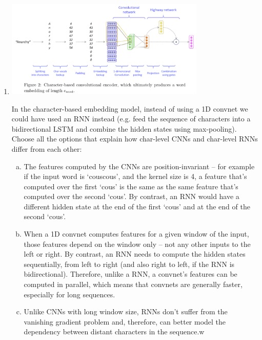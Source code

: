 \begin{enumerate}[1.]

\item {}

\begin{center}
\includegraphics[width=0.75\textwidth]{4-1.png}
\end{center}

In the character-based embedding model, instead of using a 1D convnet we could have used an RNN instead (e.g. feed the sequence of characters into a bidirectional LSTM and combine the hidden states using max-pooling). Choose all the options that explain how char-level CNNs and char-level RNNs differ from each other:

\begin{enumerate}[(a)]
\item The features computed by the CNNs are position-invariant -- for example if the input word is `couscous', and the kernel size is 4, a feature that's computed over the first `cous' is the same as the same feature that's computed over the second `cous'. By contrast, an RNN would have a different hidden state at the end of the first `cous' and at the end of the second `cous'.
\item When a 1D convnet computes features for a given window of the input, those features depend on the window only -- not any other inputs to the left or right. By contrast, an RNN needs to compute the hidden states sequentially, from left to right (and also right to left, if the RNN is bidirectional). Therefore, unlike a RNN, a convnet's features can be computed in parallel, which means that convnets are generally faster, especially for long sequences.
\item Unlike CNNs with long window size, RNNs don't suffer from the vanishing gradient problem and, therefore, can better model the dependency between distant characters in the sequence.w
\end{enumerate}


\end{enumerate}

